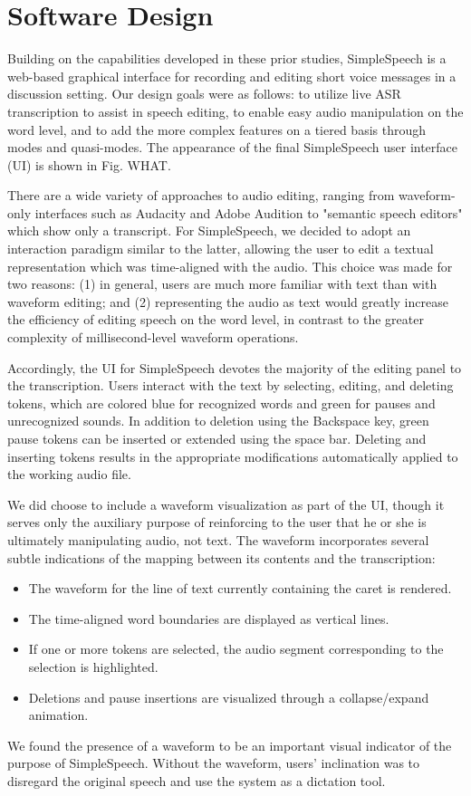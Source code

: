 \documentclass{sigchi}
\begin{document}
\section{Software Design}
Building on the capabilities developed in these prior studies, SimpleSpeech is a web-based graphical interface for recording and editing short voice messages in a discussion setting.
Our design goals were as follows: to utilize live ASR transcription to assist in speech editing, to enable easy audio manipulation on the word level, and to add the more complex features on a tiered basis through modes and quasi-modes.
The appearance of the final SimpleSpeech user interface (UI) is shown in Fig. WHAT.

There are a wide variety of approaches to audio editing, ranging from waveform-only interfaces such as Audacity and Adobe Audition to "semantic speech editors" \cite{whittaker_semantic} which show only a transcript. 
For SimpleSpeech, we decided to adopt an interaction paradigm similar to the latter, allowing the user to edit a textual representation which was time-aligned with the audio.
This choice was made for two reasons: (1) in general, users are much more familiar with text than with waveform editing; and (2) representing the audio as text would greatly increase the efficiency of editing speech on the word level, in contrast to the greater complexity of millisecond-level waveform operations. 

Accordingly, the UI for SimpleSpeech devotes the majority of the editing panel to the transcription. 
Users interact with the text by selecting, editing, and deleting tokens, which are colored blue for recognized words and green for pauses and unrecognized sounds. 
In addition to deletion using the Backspace key, green pause tokens can be inserted or extended using the space bar.
Deleting and inserting tokens results in the appropriate modifications automatically applied to the working audio file.

We did choose to include a waveform visualization as part of the UI, though it serves only the auxiliary purpose of reinforcing to the user that he or she is ultimately manipulating audio, not text. The waveform incorporates several subtle indications of the mapping between its contents and the transcription:
\begin{itemize}
	\item The waveform for the line of text currently containing the caret is rendered.
	\item The time-aligned word boundaries are displayed as vertical lines.
	\item If one or more tokens are selected, the audio segment corresponding to the selection is highlighted.
	\item Deletions and pause insertions are visualized through a collapse/expand animation.
\end{itemize}
We found the presence of a waveform to be an important visual indicator of the purpose of SimpleSpeech.
Without the waveform, users' inclination was to disregard the original speech and use the system as a dictation tool.
\end{document}
